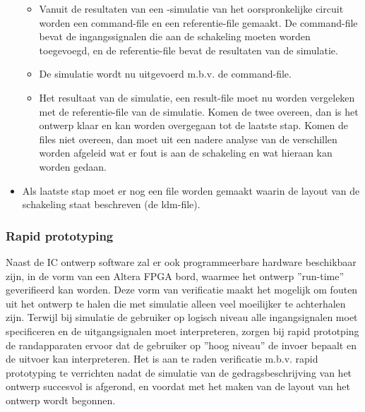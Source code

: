 \begin{itemize}
\begin{itemize}
     \item Vanuit de resultaten van een -simulatie van het oorspronkelijke
           circuit worden een command-file en een referentie-file gemaakt.
           De command-file bevat de ingangssignalen die aan de schakeling
           moeten worden toegevoegd, en de referentie-file bevat de
           resultaten van de simulatie.
     \item De simulatie wordt nu uitgevoerd m.b.v. de command-file.
     \item Het resultaat van de simulatie, een result-file moet nu worden
           vergeleken met de referentie-file van de simulatie.
           Komen de twee overeen, dan is het ontwerp klaar en kan worden
           overgegaan tot de laatste stap. Komen de files niet overeen, 
           dan moet uit een nadere analyse van de verschillen worden
           afgeleid wat er fout is aan de schakeling en wat hieraan kan worden
           gedaan.
     \end{itemize}
\item Als laatste stap moet er nog een file worden gemaakt waarin de
      layout van de schakeling staat beschreven (de ldm-file).
\end{itemize}      
\subsubsection{Rapid prototyping}
Naast de IC ontwerp software zal er ook programmeerbare hardware beschikbaar
zijn, in de vorm van een Altera FPGA bord, waarmee het ontwerp ''run-time''
geverifieerd kan worden.
Deze vorm van verificatie maakt het
mogelijk om fouten uit het ontwerp te halen die met simulatie alleen
veel moeilijker te achterhalen zijn.
Terwijl bij simulatie de gebruiker op logisch niveau alle ingangsignalen moet 
specificeren en de uitgangsignalen moet interpreteren, 
zorgen bij rapid prototping de randapparaten ervoor dat de gebruiker 
op ''hoog niveau'' de invoer bepaalt en de uitvoer kan interpreteren.
Het is aan te raden verificatie m.b.v. rapid prototyping te verrichten
nadat de simulatie van de gedragsbeschrijving van het ontwerp succesvol is 
afgerond, en voordat met het maken van de layout van het ontwerp
wordt begonnen.

